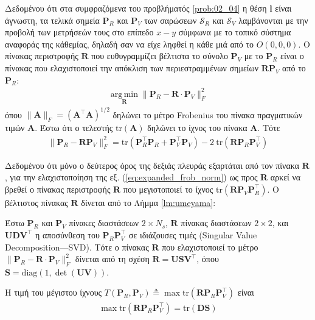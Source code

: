 Δεδομένου ότι στα συμφραζόμενα του προβλήματός \ref{prob:02_04} η θέση $\bm{l}$
είναι άγνωστη, τα τελικά σημεία $\bm{P}_R$ και $\bm{P}_V$ των σαρώσεων
$\mathcal{S}_R$ και $\mathcal{S}_V$ λαμβάνονται με την προβολή των μετρήσεών
τους στο επίπεδο $x-y$ σύμφωνα με το τοπικό σύστημα αναφοράς της κάθεμίας,
δηλαδή σαν να είχε ληφθεί η κάθε μιά από το $O(0,0,0)$. Ο πίνακας περιστροφής
$\bm{R}$ που ευθυγραμμίζει βέλτιστα το σύνολο $\bm{P}_V$ με το $\bm{P}_R$ είναι
ο πίνακας που ελαχιστοποιεί την απόκλιση των περιεστραμμένων σημείων
$\bm{R}\bm{P}_V$ από το
$\bm{P}_R$:
\begin{align}
  \operatorname*{arg\,min}\limits_{\bm{R}} \|\bm{P}_R - \bm{R} \cdot \bm{P}_V\|_F^2 \nonumber
\end{align}
όπου $\|\bm{A}\|_F = (\bm{A}^\top\bm{A})^{1/2}$ δηλώνει το μέτρο Frobenius του
πίνακα πραγματικών τιμών $\bm{A}$. Έστω ότι ο τελεστής $\text{tr}(\bm{A})$
δηλώνει το ίχνος του πίνακα $\bm{A}$. Τότε
\begin{align}
  \|\bm{P}_R - \bm{R} \bm{P}_V\|_F^2 = \text{tr}(\bm{P}_R^\top \bm{P}_R + \bm{P}_V^\top \bm{P}_V) - 2 \ \text{tr}(\bm{R} \bm{P}_R \bm{P}_V^\top)
  \label{eq:expanded_frob_norm}
\end{align}

Δεδομένου ότι μόνο ο δεύτερος όρος της δεξιάς πλευράς εξαρτάται από τον πίνακα
$\bm{R}$, για την ελαχιστοποίηση της εξ. (\ref{eq:expanded_frob_norm}) ως προς
$\bm{R}$ αρκεί να βρεθεί ο πίνακας περιστροφής $\bm{R}$ που μεγιστοποιεί
το ίχνος $\text{tr}(\bm{R} \bm{P}_V \bm{P}_R^\top)$. Ο βέλτιστος πίνακας
$\bm{R}$ δίνεται από το Λήμμα \ref{lm:umeyama}:

\begin{lemma}
  \label{lm:umeyama}
  Έστω $\bm{P}_R$ και $\bm{P}_V$ πίνακες διαστάσεων $2 \times N_s$, $\bm{R}$
  πίνακας διαστάσεων $2 \times 2$, και $\bm{U} \bm{D} \bm{V}^\top$ η αποσύνθεση
  του $\bm{P}_R \bm{P}_V^\top$ σε ιδιάζουσες τιμές (Singular Value
  Decomposition---SVD). Τότε ο πίνακας $\bm{R}$ που ελαχιστοποιεί το μέτρο
  $\|\bm{P}_R - \bm{R} \cdot \bm{P}_V\|_F^2$ δίνεται από τη σχέση
  $\bm{R} = \bm{U} \bm{S} \bm{V}^\top$, όπου
  $\bm{S} = \text{diag}(1,\det{(\bm{U}\bm{V})})$.
\end{lemma}

\begin{corollary}
  \label{corollary:umeyama}
  Η τιμή του μέγιστου ίχνους
  $T(\bm{P}_R, \bm{P}_V) \triangleq \max\text{tr}(\bm{R} \bm{P}_R \bm{P}_V^\top)$
  είναι
  \begin{align}
  \max\text{tr}(\bm{R} \bm{P}_R \bm{P}_V^\top) = \text{tr}(\bm{D}\bm{S})
  \end{align}
\end{corollary}

